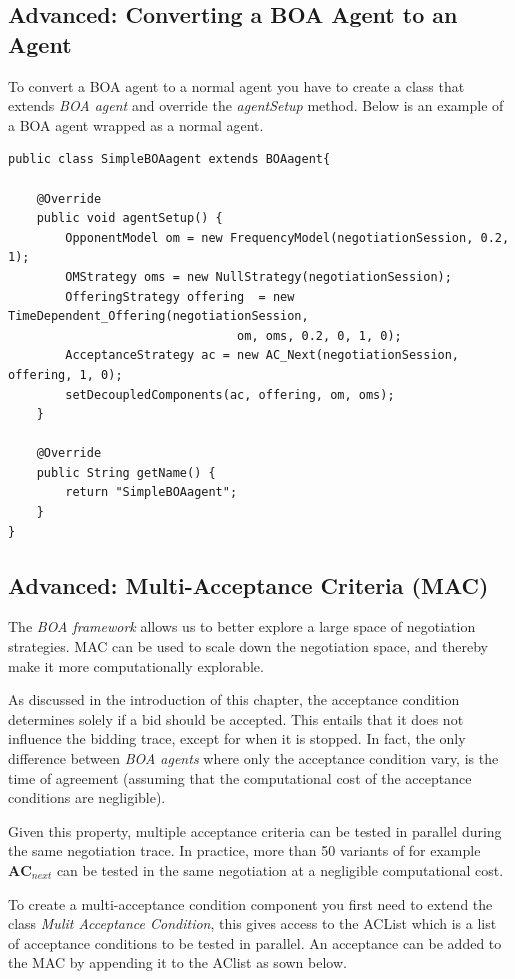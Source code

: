 \documentclass[]{article}
\begin{document}
\subsection{Advanced: Converting a BOA Agent to an Agent}
To convert a BOA agent to a normal agent you have to create a class that extends \textit{BOA agent} and override the \textit{agentSetup} method. Below is an example of a BOA agent wrapped as a normal agent.

\begin{lstlisting}
public class SimpleBOAagent extends BOAagent{

	@Override
	public void agentSetup() {
		OpponentModel om = new FrequencyModel(negotiationSession, 0.2, 1);
		OMStrategy oms = new NullStrategy(negotiationSession);
		OfferingStrategy offering  = new TimeDependent_Offering(negotiationSession,
								om, oms, 0.2, 0, 1, 0);
		AcceptanceStrategy ac = new AC_Next(negotiationSession, offering, 1, 0);
		setDecoupledComponents(ac, offering, om, oms);		
	}

	@Override
	public String getName() {
		return "SimpleBOAagent";
	}
}
\end{lstlisting}

\subsection{Advanced: Multi-Acceptance Criteria (MAC)}
The \textit{BOA framework} allows us to better explore a large space of negotiation strategies. MAC can be used to scale down the negotiation space, and thereby make it more computationally explorable.

As discussed in the introduction of this chapter, the acceptance condition determines solely if a bid should be accepted. This entails that it does not influence the bidding trace, except for when it is stopped. In fact, the only difference between \textit{BOA agents} where only the acceptance condition vary, is the time of agreement (assuming that the computational cost of the acceptance conditions are negligible).

Given this property, multiple acceptance criteria can be tested in parallel during the same negotiation trace. In practice, more than 50 variants of for example $\textbf{AC}_{next}$ can be tested in the same negotiation at a negligible computational cost.

To create a multi-acceptance condition component you first need to extend the class \textit{Mulit Acceptance Condition}, this gives access to the ACList which is a list of acceptance conditions to be tested in parallel. An acceptance can be added to the MAC by appending it to the AClist as sown below.
\end{document}
